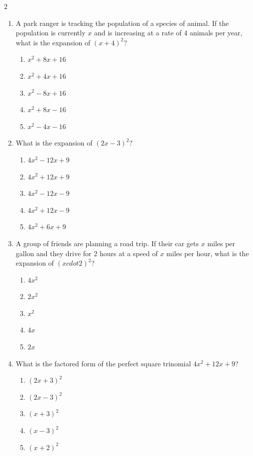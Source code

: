 \documentclass[10pt]{article}
\begin{document}
\begin{multicols}{2}
\begin{enumerate}[label=\textbf{Q\arabic*.}, leftmargin=*, itemsep=6pt, parsep=0pt]
  \item \small A park ranger is tracking the population of a species of animal. If the population is currently $x$ and is increasing at a rate of 4 animals per year, what is the expansion of $(x + 4)^2$?
  \begin{enumerate}[label=(\Alph*), leftmargin=0.6cm, nosep, itemsep=2pt]
    \item $x^2 + 8x + 16$
    \item $x^2 + 4x + 16$
    \item $x^2 - 8x + 16$
    \item $x^2 + 8x - 16$
    \item $x^2 - 4x - 16$
  \end{enumerate}

  \item \small What is the expansion of $(2x - 3)^2$?
  \begin{enumerate}[label=(\Alph*), leftmargin=0.6cm, nosep, itemsep=2pt]
    \item $4x^2 - 12x + 9$
    \item $4x^2 + 12x + 9$
    \item $4x^2 - 12x - 9$
    \item $4x^2 + 12x - 9$
    \item $4x^2 + 6x + 9$
  \end{enumerate}

  \item \small A group of friends are planning a road trip. If their car gets $x$ miles per gallon and they drive for 2 hours at a speed of $x$ miles per hour, what is the expansion of $(x cdot 2)^2$?
  \begin{enumerate}[label=(\Alph*), leftmargin=0.6cm, nosep, itemsep=2pt]
    \item $4x^2$
    \item $2x^2$
    \item $x^2$
    \item $4x$
    \item $2x$
  \end{enumerate}

  \item \small What is the factored form of the perfect square trinomial $4x^2 + 12x + 9$?
  \begin{enumerate}[label=(\Alph*), leftmargin=0.6cm, nosep, itemsep=2pt]
    \item $(2x + 3)^2$
    \item $(2x - 3)^2$
    \item $(x + 3)^2$
    \item $(x - 3)^2$
    \item $(x + 2)^2$
  \end{enumerate}


\end{enumerate}
\end{multicols}
\end{document}
